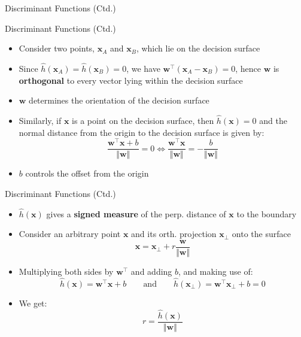 \begin{frame}{Discriminant Functions (Ctd.)}{}
	\vspace*{-2mm}
	
\end{frame}


\begin{frame}{Discriminant Functions (Ctd.)}{}
	\begin{itemize}
		\item Consider two points, $\bm{x}_A$ and $\bm{x}_B$, which lie on the decision surface
		\item Since $\widehat{h}(\bm{x}_A) = \widehat{h}(\bm{x}_B) = 0$, we have $\bm{w}^{\intercal}(\bm{x}_A - \bm{x}_B) = 0$,
			hence $\bm{w}$ is \textbf{orthogonal} to every vector lying within the decision surface
		\item $\bm{w}$ determines the orientation of the decision surface
		\item Similarly, if $\bm{x}$ is a point on the decision surface, then $\widehat{h}(\bm{x}) = 0$ and the normal distance from the
			origin to the decision surface is given by:
		\begin{equation}
			\frac{\bm{w}^{\intercal} \bm{x} + b}{\Vert \bm{w} \Vert} = 0
			\Leftrightarrow
			\frac{\bm{w}^{\intercal} \bm{x}}{\Vert \bm{w} \Vert} = -\frac{b}{\Vert \bm{w} \Vert}
		\end{equation}
		\item $b$ controls the offset from the origin
	\end{itemize}
\end{frame}


\begin{frame}{Discriminant Functions (Ctd.)}{}
	\begin{itemize}
		\item $\widehat{h}(\bm{x})$ gives a \textbf{signed measure} of the perp. distance of $\bm{x}$ to the boundary
		\item Consider an arbitrary point $\bm{x}$ and its orth. projection $\bm{x}_{\perp}$ onto the surface
		\begin{equation}
			\bm{x} = \bm{x}_{\perp} + r \frac{\bm{w}}{\Vert \bm{w} \Vert}
		\end{equation}
		\item Multiplying both sides by $\bm{w}^{\intercal}$ and adding $b$, and making use of:
		\begin{equation*}
			\widehat{h}(\bm{x})
				= \bm{w}^{\intercal} \bm{x} + b \qquad \text{and} \qquad
			\widehat{h}(\bm{x}_{\perp})
				= \bm{w}^{\intercal} \bm{x}_{\perp} + b = 0			
		\end{equation*}
		\item We get:
		\begin{equation}
			r = \frac{\widehat{h}(\bm{x})}{\Vert \bm{w} \Vert}
		\end{equation}
	\end{itemize}
\end{frame}


